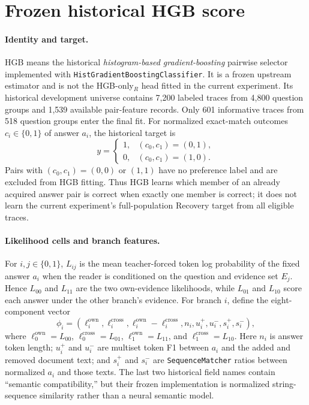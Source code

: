 \documentclass[10pt]{article}
\begin{document}
\section{Frozen historical HGB score}
\label{sec:hgb-score}

\paragraph{Identity and target.}
HGB means the historical \emph{histogram-based gradient-boosting} pairwise selector implemented with \texttt{HistGradientBoostingClassifier}. It is a frozen upstream estimator and is not the HGB-only$_R$ head fitted in the current experiment. Its historical development universe contains 7,200 labeled traces from 4,800 question groups and 1,539 available pair-feature records. Only 601 informative traces from 518 question groups enter the final fit. For normalized exact-match outcomes $c_i\in\{0,1\}$ of answer $a_i$, the historical target is
\[
 y=\begin{cases}
 1,&(c_0,c_1)=(0,1),\\
 0,&(c_0,c_1)=(1,0).
 \end{cases}
\]
Pairs with $(c_0,c_1)=(0,0)$ or $(1,1)$ have no preference label and are excluded from HGB fitting. Thus HGB learns which member of an already acquired answer pair is correct when exactly one member is correct; it does not learn the current experiment's full-population Recovery target from all eligible traces.

\paragraph{Likelihood cells and branch features.}
For $i,j\in\{0,1\}$, $L_{ij}$ is the mean teacher-forced token log probability of the fixed answer $a_i$ when the reader is conditioned on the question and evidence set $E_j$. Hence $L_{00}$ and $L_{11}$ are the two own-evidence likelihoods, while $L_{01}$ and $L_{10}$ score each answer under the other branch's evidence. For branch $i$, define the eight-component vector
\[
 \phi_i=(\ell_i^{\mathrm{own}},\ell_i^{\mathrm{cross}},
 \ell_i^{\mathrm{own}}-\ell_i^{\mathrm{cross}},n_i,
 u_i^+,u_i^-,s_i^+,s_i^-),
\]
where $\ell_0^{\mathrm{own}}=L_{00}$, $\ell_0^{\mathrm{cross}}=L_{01}$, $\ell_1^{\mathrm{own}}=L_{11}$, and $\ell_1^{\mathrm{cross}}=L_{10}$. Here $n_i$ is answer token length; $u_i^+$ and $u_i^-$ are multiset token F1 between $a_i$ and the added and removed document text; and $s_i^+$ and $s_i^-$ are \texttt{SequenceMatcher} ratios between normalized $a_i$ and those texts. The last two historical field names contain ``semantic compatibility,'' but their frozen implementation is normalized string-sequence similarity rather than a neural semantic model.
\end{document}

